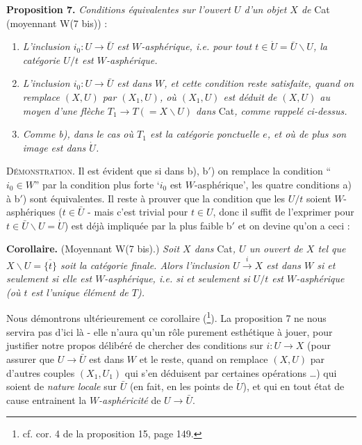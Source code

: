 \textbf{Proposition 7.} \textit{Conditions équivalentes sur l’ouvert $U$ d’un objet $X$ de} Cat (moyennant W(7 bis)) :

\begin{enumerate}[label={}, leftmargin=*]
\item[\textit{a)}] \textit{L’inclusion $i_0:U\longrightarrow\bar U$ est $W$-asphérique, i.e. pour tout $t\in\dot U=\bar U\backslash U$, la catégorie $U/t$ est $W$-asphérique.}
\item[\textit{b)}] \textit{L’inclusion $i_0:U\longrightarrow\bar U$ est dans $W$, et cette condition reste satisfaite, quand on remplace $(X,U)$ par $(X_1,U)$, où $(X_1,U)$ est déduit de $(X,U)$ au moyen d’une flèche $T_1\longrightarrow T(=X\backslash U)$ dans} Cat\textit{, comme rappelé ci-dessus.}
\item[\textit{b$'$)}] \textit{Comme b), dans le cas où $T_1$ est la catégorie ponctuelle $e$, et où de plus son image est dans $\dot U$.}
\end{enumerate}

\textsc{Démonstration}. Il est évident que si dans b), b$'$) on remplace la condition “$i_0\in W$” par la condition plus forte ‘$i_0$ est $W$-asphérique’, les quatre conditions a) à b$'$) sont équivalentes. Il reste à prouver que la condition que les $U/t$ soient $W$-asphériques ($t\in\bar U$ - mais c’est trivial pour $t\in U$, donc il suffit de l’exprimer pour $t\in\bar U\backslash U=\dot U$) est déjà impliquée par la plus faible b$'$ et on devine qu’on a ceci :


\textbf{Corollaire.} (Moyennant W(7 bis).) \textit{Soit $X$ dans} Cat\textit{, $U$ un ouvert de $X$ tel que $X\backslash U=\overline{\{t\}}$ soit la catégorie finale. Alors l’inclusion $U\xrightarrow{i}X$ est dans $W$ si et seulement si elle est $W$-asphérique, i.e. si et seulement si $U/t$ est $W$-asphérique (où $t$ est l’unique élément de $T$).}

Nous démontrons ultérieurement ce corollaire (\footnote[65]{cf. cor. 4 de la proposition 15, page 149.}). La proposition 7 ne nous servira pas d’ici là - elle n’aura qu’un rôle purement esthétique à jouer, pour justifier notre propos délibéré de chercher des conditions sur $i:U\longrightarrow X$ (pour assurer que $U\longrightarrow\bar U$ est dans $W$ et le reste, quand on remplace $(X,U)$ par d’autres couples $(X_1,U_1)$ qui s’en déduisent par certaines opérations \dots) qui
soient de \textit{nature locale} sur $\bar U$ (en fait, en les points de $\dot U$), et qui en tout état de cause entrainent la \textit{$W$-asphéricité} de $U\longrightarrow\bar U$.

